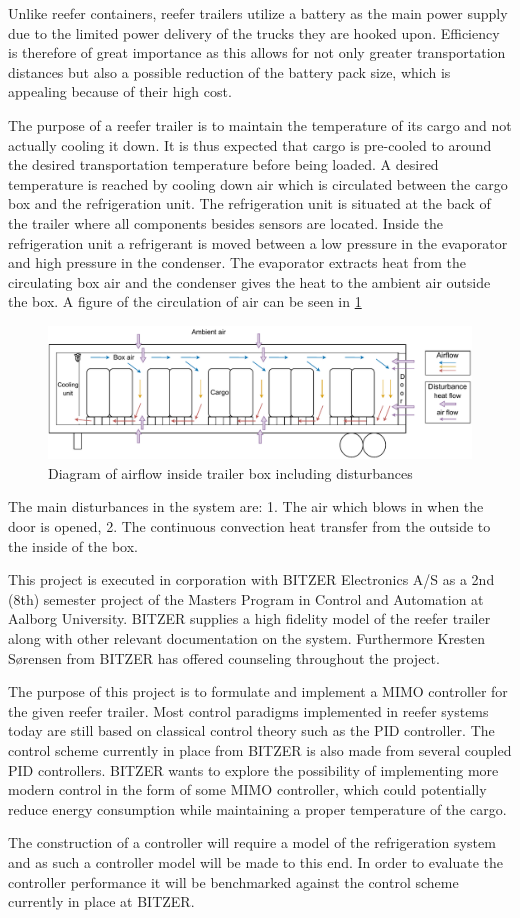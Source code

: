 Unlike reefer containers, reefer trailers utilize a battery as the main power supply due to the limited power delivery of the trucks they are hooked upon. Efficiency is therefore of great importance as this allows for not only greater transportation distances but also a possible reduction of the battery pack size, which is appealing because of their high cost.

The purpose of a reefer trailer is to maintain the temperature of its cargo and not actually cooling it down. It is thus expected that cargo is pre-cooled to around the desired transportation temperature before being loaded. A desired temperature is reached by cooling down air which is circulated between the cargo box and the refrigeration unit. The refrigeration unit is situated at the back of the trailer where all components besides sensors are located. Inside the refrigeration unit a refrigerant is moved between a low pressure in the evaporator and high pressure in the condenser. The evaporator extracts heat from the circulating box air and the condenser gives the heat to the ambient air outside the box. A figure of the circulation of air can be seen in \cref{fig:trailer_airflow}

\begin{figure}[h]
	\centering
	\includegraphics[width = 0.8\linewidth]{Graphics/Trailer_airflow.pdf}
	\caption{Diagram of airflow inside trailer box including disturbances}
	\label{fig:trailer_airflow}
\end{figure}

The main disturbances in the system are: 1. The air which blows in when the door is opened, 2. The continuous convection heat transfer from the outside to the inside of the box.

This project is executed in corporation with BITZER Electronics A/S as a 2nd (8th) semester project of the Masters Program in Control and Automation at Aalborg University. BITZER supplies a high fidelity model of the reefer trailer along with other relevant documentation on the system. Furthermore Kresten Sørensen from BITZER has offered counseling throughout the project.

The purpose of this project is to formulate and implement a MIMO controller for the given reefer trailer. Most control paradigms implemented in reefer systems today are still based on classical control theory such as the PID controller. The control scheme currently in place from BITZER is also made from several coupled PID controllers. BITZER wants to explore the possibility of implementing more modern control in the form of some MIMO controller, which could potentially reduce energy consumption while maintaining a proper temperature of the cargo.

The construction of a controller will require a model of the refrigeration system and as such a controller model will be made to this end. In order to evaluate the controller performance it will be benchmarked against the control scheme currently in place at BITZER.